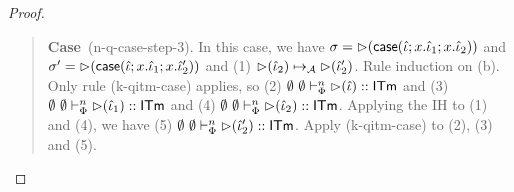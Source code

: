\documentclass[12pt]{article}
\newcommand{\pfcase}[1]{\textbf{Case}~#1. }
\begin{document}
\begin{proof}
\begin{quote}
    \pfcase{(n-q-case-step-3)} In this case, we have $\sigma={\rhd}({\sf case}(\hat{\iota}; x.\hat{\iota}_1; x.\hat{\iota}_2))$ and $\sigma'={\rhd}({\sf case}(\hat{\iota}; x.\hat{\iota}_1; x.\hat{\iota}_2'))$ and (1) ${\rhd}(\hat{\iota}_2) \mapsto_{\mathcal{A}} {\rhd}(\hat{\iota}_2')$. Rule induction on (b). Only rule (k-qitm-case) applies, so (2) $\emptyset~\emptyset \vdash_{\Phi}^{n} {\rhd}(\hat{\iota}) :: {\sf ITm}$ and (3) $\emptyset~\emptyset \vdash_{\Phi}^{n} {\rhd}(\hat{\iota}_1) :: {\sf ITm}$ and (4) $\emptyset~\emptyset \vdash_{\Phi}^{n} {\rhd}(\hat{\iota}_2) :: {\sf ITm}$. Applying the IH to (1) and (4), we have (5) $\emptyset~\emptyset \vdash_{\Phi}^{n} {\rhd}(\hat{\iota}_2') :: {\sf ITm}$. Apply (k-qitm-case) to (2), (3) and (5). 
\end{quote}







\end{proof}
\end{document}
